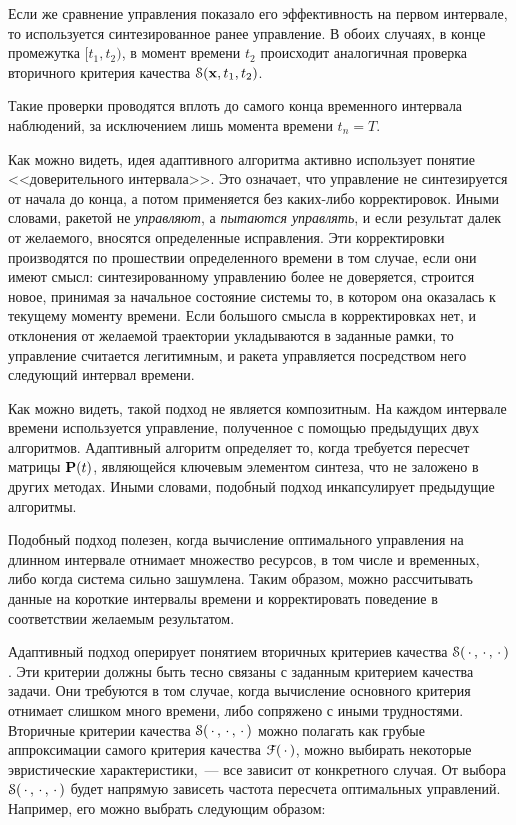 Если же сравнение управления показало его эффективность на первом интервале, то используется синтезированное ранее управление. В обоих случаях, в конце промежутка $[t_1, t_2)$, в момент времени $t_2$ происходит аналогичная проверка вторичного критерия качества $\mathcal{S}(\mathbf{x}, t_1, t_2)$.

Такие проверки проводятся вплоть до самого конца временного интервала наблюдений, за исключением лишь момента времени $t_n = T$.

\br

Как можно видеть, идея адаптивного алгоритма активно использует понятие <<доверительного интервала>>. Это означает, что управление не синтезируется от начала до конца, а потом применяется без каких-либо корректировок. Иными словами, ракетой не \emph{управляют}, а \emph{пытаются управлять}, и если результат далек от желаемого, вносятся определенные исправления. Эти корректировки производятся по прошествии определенного времени в том случае, если они имеют смысл: синтезированному управлению более не доверяется, строится новое, принимая за начальное состояние системы то, в котором она оказалась к текущему моменту времени. Если большого смысла в корректировках нет, и отклонения от желаемой траектории укладываются в заданные рамки, то управление считается легитимным, и ракета управляется посредством него следующий интервал времени.

Как можно видеть, такой подход не является композитным. На каждом интервале времени используется управление, полученное с помощью предыдущих двух алгоритмов. Адаптивный алгоритм определяет то, когда требуется пересчет матрицы $\mathbf{P}(t)$, являющейся ключевым элементом синтеза, что не заложено в других методах. Иными словами, подобный подход инкапсулирует предыдущие алгоритмы.

Подобный подход полезен, когда вычисление оптимального управления на длинном интервале отнимает множество ресурсов, в том числе и временных, либо когда система сильно зашумлена. Таким образом, можно рассчитывать данные на короткие интервалы времени и корректировать поведение в соответствии желаемым результатом.

Адаптивный подход оперирует понятием вторичных критериев качества $\mathcal{S}(\,\cdotp, \,\cdotp, \,\cdotp)$. Эти критерии должны быть тесно связаны с заданным критерием качества задачи. Они требуются в том случае, когда вычисление основного критерия отнимает слишком много времени, либо сопряжено с иными трудностями. Вторичные критерии качества $\mathcal{S}(\,\cdotp, \,\cdotp, \,\cdotp)$ можно полагать как грубые аппроксимации самого критерия качества $\mathcal{F}(\,\cdotp)$, можно выбирать некоторые эвристические характеристики,~--- все зависит от конкретного случая. От выбора $\mathcal{S}(\,\cdotp, \,\cdotp, \,\cdotp)$ будет напрямую зависеть частота пересчета оптимальных управлений. Например, его можно выбрать следующим образом:

